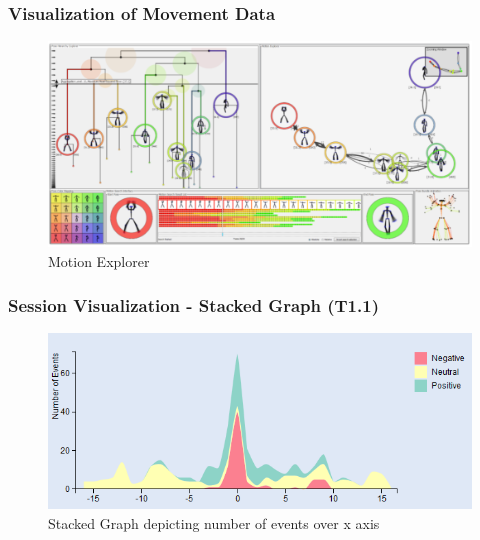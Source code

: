 \documentclass{beamer}
\begin{document}
\begin{frame}
\frametitle{Visualization of Movement Data}
\begin{figure}
\includegraphics[scale=0.4]{images/bernard_motionexplorer.png}
\caption{Motion Explorer}
\end{figure}
\end{frame}
\begin{frame}
\frametitle{Session Visualization - Stacked Graph (T1.1)}
\begin{figure}
\includegraphics[scale=0.7]{images/stackedgraph_linear.png}
\caption{Stacked Graph depicting number of events over x axis}
\end{figure}
\end{frame}
\end{document}
